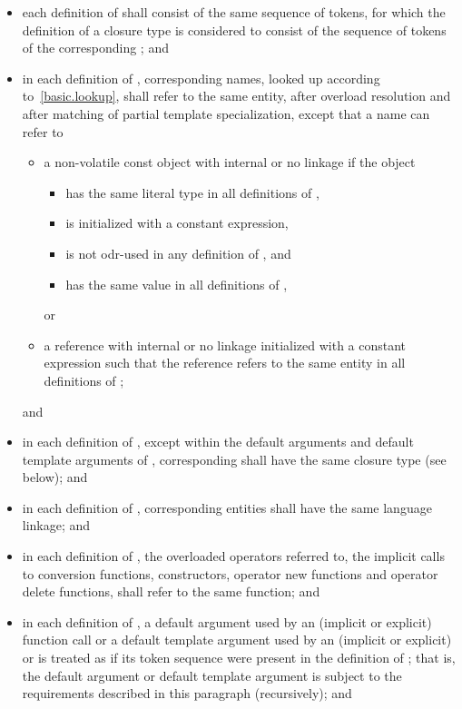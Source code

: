 \begin{itemize}
\item each definition of  shall consist of
the same sequence of tokens,
for which the definition of a closure type
is considered to consist of the sequence of tokens of
the corresponding ; and
\item in each definition of , corresponding names, looked up
according to~\ref{basic.lookup}, shall refer to the same entity, after
overload resolution and after matching of partial
template specialization, except that a name can refer to
\begin{itemize}
\item
a non-volatile const object with internal or no linkage if the object
\begin{itemize}
\item has the same literal type in all definitions of ,
\item is initialized with a constant expression,
\item is not odr-used in any definition of , and
\item has the same value in all definitions of ,
\end{itemize}
or
\item
a reference with internal or no linkage
initialized with a constant expression such that
the reference refers to the same entity in all definitions of ;
\end{itemize}
and

\item in each definition of , except within
the default arguments and default template arguments of ,
corresponding  shall have
the same closure type (see below); and

\item in each definition of , corresponding entities shall have the
same language linkage; and

\item in each definition of , the overloaded operators referred
to, the implicit calls to conversion functions, constructors, operator
new functions and operator delete functions, shall refer to the same
function; and

\item in each definition of ,
a default argument used by an (implicit or explicit) function call or
a default template argument used by an (implicit or explicit)
 or 
is treated as if its token sequence
were present in the definition of ;
that is, the default argument or default template argument
is subject to the requirements described in this paragraph (recursively); and


\end{itemize}
